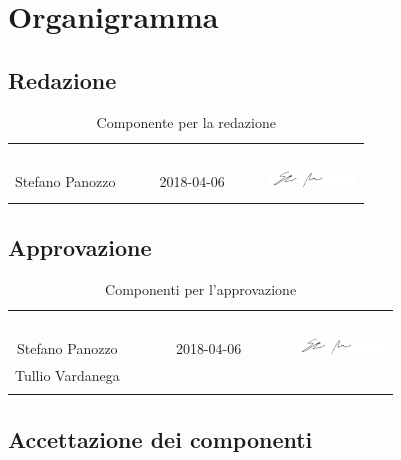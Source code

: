 \newpage
\renewcommand{\arraystretch}{1}

\section{Organigramma}

\subsection{Redazione}
\begin{longtable}{ c  c  c }
	\rowcolor{bluSOS}
	\textcolor{white}{\textbf{Nominativo}} & \textcolor{white}{\textbf{Data di redazione}} & \textcolor{white}{\textbf{Firma}}\\
	
	Stefano Panozzo & 2018-04-06 & \includegraphics[height=0.5cm]{img/Firme/StefanoPanozzo.png}\\
	\caption{Componente per la redazione}  \\
\end{longtable}

\subsection{Approvazione}
\begin{longtable}{ c  c  c }
	\rowcolor{bluSOS}
	\textcolor{white}{\textbf{Nominativo}} & \textcolor{white}{\textbf{Data di approvazione}} & \textcolor{white}{\textbf{Firma}}\\
	
	Stefano Panozzo & 2018-04-06 & \includegraphics[height=0.5cm]{img/Firme/StefanoPanozzo.png}  \\
	Tullio Vardanega & & \\
	\rowcolor{white}\caption{Componenti per l'approvazione}\\
\end{longtable}

\subsection{Accettazione dei componenti}

